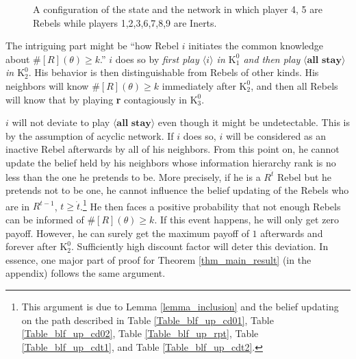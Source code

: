 \documentclass[12pt,letter]{article}
\newcommand{\Kappa}{\mathrm{K}}
\theoremstyle{definition}
\theoremstyle{remark}
\theoremstyle{claim}
\begin{document}
\begin{figure}

\label{fig:central_less_k}
\begin{center}
\end{center}
\caption{A configuration of the state and the network in which player 4, 5 are Rebels while players 1,2,3,6,7,8,9 are Inerts.}
\end{figure}

The intriguing part might be ``how Rebel $i$ initiates the common knowledge about $\#[R](\theta)\geq k$.'' $i$ does so by \textit{first play $\langle i \rangle$ in $\Kappa^0_{1}$ and then play} $\langle \textbf{all stay} \rangle$ \textit{in $\Kappa^0_{2}$}. His behavior is then distinguishable from Rebels of other kinds. His neighbors will know $\#[R](\theta)\geq k$ immediately after $\Kappa^0_{2}$, and then all Rebels will know that by playing \textbf{r} contagiously in $\Kappa^0_{3}$. 

$i$ will not deviate to play $\langle \textbf{all stay} \rangle$ even though it might be undetectable. This is by the assumption of acyclic network. If $i$ does so, $i$ will be considered as an inactive Rebel afterwards by all of his neighbors. From this point on, he cannot update the belief held by his neighbors whose information hierarchy rank is no less than the one he pretends to be. More precisely, if he is a $R^{\dot{t}}$ Rebel but he pretends not to be one, he cannot influence the belief updating of the Rebels who are in $R^{t-1}$, $t\geq \dot{t}$.\footnote{This argument is due to Lemma \ref{lemma_inclusion} and the belief updating on the path described in Table \ref{Table_blf_up_cd01}, Table \ref{Table_blf_up_cd02}, Table \ref{Table_blf_up_rpt}, Table \ref{Table_blf_up_cdt1}, and Table \ref{Table_blf_up_cdt2}.} 
He then faces a positive probability that not enough Rebels can be informed of $\#[R](\theta)\geq k$. If this event happens, he will only get zero payoff. However, he can surely get the maximum payoff of $1$ afterwards and forever after $\Kappa^0_2$. Sufficiently high discount factor will deter this deviation. In essence, one major part of proof for Theorem \ref{thm_main_result} (in the appendix) follows the same argument.
\end{document}
